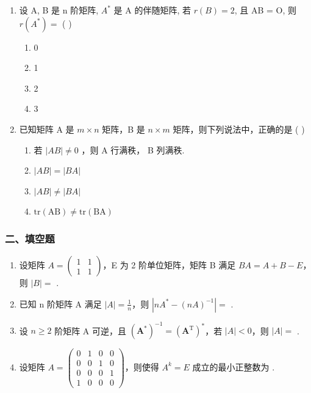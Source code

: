 \documentclass[12pt, a4paper]{ctexart}
\begin{document}
\begin{enumerate}
    \item 设 A, B 是 n 阶矩阵, $ A^{*} $ 是 A 的伴随矩阵, 若 $ r(B) = 2 $, 且 AB = O, 则 $ r(A^{*}) = $ ( \underline{\hspace{1cm}} )
    \begin{enumerate}[label=(\Alph*)]
        \item 0
        \item 1
        \item 2
        \item 3
    \end{enumerate}

    \item 已知矩阵 A 是 $ m \times n $ 矩阵，B 是 $ n \times m $ 矩阵，则下列说法中，正确的是 ( \underline{\hspace{1cm}} )
    \begin{enumerate}[label=(\Alph*)]
        \item 若 $ \left|AB\right|\neq0 $ ，则 A 行满秩， B 列满秩.
        \item $ \left|AB\right|=\left|BA\right| $
        \item $ \left|AB\right|\neq\left|BA\right| $
        \item $ \mathrm{tr}(\mathrm{AB}) \neq \mathrm{tr}(\mathrm{BA}) $
    \end{enumerate}
\end{enumerate}

\subsubsection*{二、填空题}

\begin{enumerate}[start=11]
    \item 设矩阵 $ A=\begin{pmatrix}1&1\\ 1&1\end{pmatrix} $，E 为 2 阶单位矩阵，矩阵 B 满足 $ BA=A+B-E $，则 $ |B|= $ \underline{\hspace{2cm}}.

    \item 已知 n 阶矩阵 A 满足 $ |A| = \frac{1}{n} $，则 $ \left|n A^{*} - (n A)^{-1}\right| = $ \underline{\hspace{2cm}}.

    \item 设 $ n \geq 2 $ 阶矩阵 A 可逆，且 $ \left(\mathbf{A}^{*}\right)^{-1} = \left(\mathbf{A}^{\mathrm{T}}\right)^{*} $，若 $ |A| < 0 $，则 $ |A| = $ \underline{\hspace{2cm}}.

    \item 设矩阵 $ A=\begin{pmatrix}0&1&0&0\\0&0&1&0\\0&0&0&1\\1&0&0&0\end{pmatrix} $，则使得 $ A^{k}=E $ 成立的最小正整数为 \underline{\hspace{2cm}}.
\end{enumerate}
\end{document}
